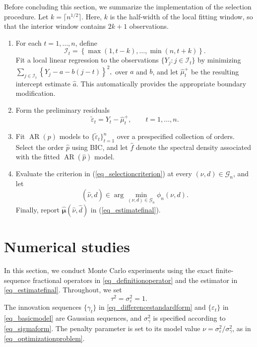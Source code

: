 \documentclass[11pt]{article}
\numberwithin{equation}{section}
\numberwithin{figure}{section}
\begin{document}
Before concluding this section, we summarize the implementation of the
selection procedure. Let $k=\lceil n^{1/2}\rceil.$ Here, \(k\) is the half-width of the local fitting window, so that the
interior window contains \(2k+1\) observations.

\begin{enumerate}
\item For each \(t=1,\ldots,n\), define
\begin{equation*}
\mathcal{I}_t
=
\left\{
\max(1,t-k),\ldots,\min(n,t+k)
\right\}.
\end{equation*}
Fit a local linear regression to the observations
\(\{Y_j:j\in\mathcal{I}_t\}\) by minimizing
$\sum_{j\in\mathcal{I}_t}
\left\{
Y_j-a-b(j-t)
\right\}^2,$
over \(a\) and \(b\), and let \(\widehat{\mu}_t^{+}\) be the resulting
intercept estimate \(\widehat a\). This automatically provides the
appropriate boundary modification.

\item Form the preliminary residuals
\begin{equation*}
\widetilde{\varepsilon}_t
=
Y_t-\widehat{\mu}_t^{+},
\qquad
t=1,\ldots,n.
\end{equation*}

\item Fit \(\operatorname{AR}(p)\) models to
\(\{\widetilde{\varepsilon}_t\}_{t=1}^n\) over a prespecified collection of
orders. Select the order \(\widehat p\) using BIC, and let
\(\widehat f\) denote the spectral density associated with the fitted
\(\operatorname{AR}(\widehat p)\) model.

\item Evaluate the criterion in (\ref{eq_selectioncriterion}) at every
\((\nu,d)\in\mathcal{G}_n\), and let
\begin{equation*}
(\widehat{\nu},\widehat d)
\in
\arg\min_{(\nu,d)\in\mathcal{G}_n}
\phi_n(\nu,d).
\end{equation*}
Finally, report $\widehat{\bm{\mu}}(\widehat{\nu},\widehat d)$ in (\ref{eq_estimatefinal}).
\end{enumerate}



\section{Numerical studies}\label{sec_numericalstudy}


In this section, we conduct Monte Carlo experiments using the exact finite-sequence fractional operators in \eqref{eq_definitionoperator} and the estimator in \eqref{eq_estimatefinal}. Throughout, we set
\begin{equation*}
\tau^2=\sigma_\varepsilon^2=1.
\end{equation*}
The innovation sequences \(\{\gamma_t\}\) in \eqref{eq_differencestandardform} and \(\{\varepsilon_t\}\) in \eqref{eq_basicmodel} are Gaussian sequences, and \(\sigma_\gamma^2\) is specified according to \eqref{eq_sigmaform}. The penalty parameter is set to its model value \(\nu=\sigma_\varepsilon^2/\sigma_\gamma^2\), as in \eqref{eq_optimizationproblem}.
\end{document}
